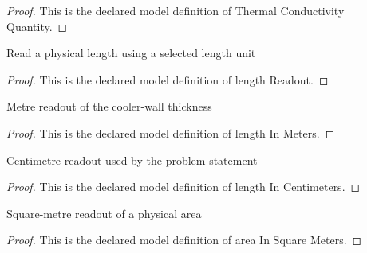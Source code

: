 \begin{proof}
  This is the declared model definition of Thermal Conductivity Quantity.
\end{proof}
\begin{definition}
  \label{def:physics:phyx-mini-0466:phyxminiproblems-problemphyxmini0466-lengthreadout}
  Read a physical length using a selected length unit
\end{definition}
\begin{proof}
  This is the declared model definition of length Readout.
\end{proof}
\begin{definition}
  \label{def:physics:phyx-mini-0466:phyxminiproblems-problemphyxmini0466-lengthinmeters}
  Metre readout of the cooler-wall thickness
\end{definition}
\begin{proof}
  This is the declared model definition of length In Meters.
\end{proof}
\begin{definition}
  \label{def:physics:phyx-mini-0466:phyxminiproblems-problemphyxmini0466-lengthincentimeters}
  Centimetre readout used by the problem statement
\end{definition}
\begin{proof}
  This is the declared model definition of length In Centimeters.
\end{proof}
\begin{definition}
  \label{def:physics:phyx-mini-0466:phyxminiproblems-problemphyxmini0466-areainsquaremeters}
  Square-metre readout of a physical area
\end{definition}
\begin{proof}
  This is the declared model definition of area In Square Meters.
\end{proof}
